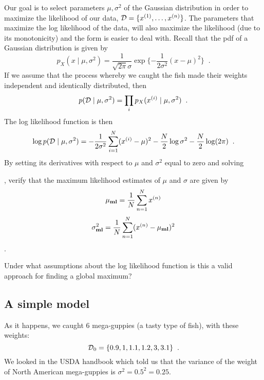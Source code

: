 \documentclass[11pt]{exam}
\newcommand\ex[2]{#1^{(#2)}}
\newcommand\data{{\cal D}}
\newcommand\ml[1]{#1_{\bf ml}}
\newcommand{\note}[1]{\todo[color=blue!10,inline, linecolor=blue!90,size=\footnotesize]{\linespread{0.9}\selectfont{#1}\par}}
\begin{document}
 Our goal is to select parameters $\mu, \sigma^2$ of the Gaussian
 distribution in order to maximize the likelihood of our data,
 $\data = \{\ex{x}{1}, \ldots, \ex{x}{n}\}$.  The parameters that maximize
 the log likelihood of the data, will also maximize the likelihood (due to its monotonicity) and
 the form is easier to deal with.
Recall that the pdf of a Gaussian distribution is given by
\[p_X(x \mid \mu, \sigma^2) = \frac{1}{\sqrt{2 \pi}\sigma}
    \exp\{-\frac{1}{2 \sigma^2}(x - \mu)^2\}\;\;.\]
If we assume that the process whereby we caught the fish made their
weights independent and identically distributed, then 
\[p(\data \mid \mu, \sigma^2) = \prod_i p_X(\ex{x}{i} \mid \mu,
  \sigma^2)\;\;.\]
The log likelihood function is then
$$
\log p(\data \mid \mu, \sigma^2)=-\frac{1}{2\sigma^2}\sum_{i=1}^N
(\ex{x}{i}-\mu)^2-\frac{N}{2}\log \sigma^2 -\frac{N}{2}\log(2\pi)\;\;.
$$
By setting its derivatives with respect to $\mu$ and $\sigma^2$ equal
to zero and solving
\iffalse
\footnote{In the exercises of this class, we often solve the system
  $\nabla_{\theta} L(\theta)=0$ for $\theta$ where $\theta$ is the
  parameter to be estimated (here, $(\mu,\sigma^{2})$) and $L$ is the
  loss function to be minimized (here, $-\log p$). From calculus
  class, we know that this is a necessary condition of $\theta$ being
  a local extremum of $L:U \rightarrow \mathbb{R}$ (where $U$ is an
  open subset of $\mathbb{R}^n$). If the loss function \(L\) is
  convex, this is also a sufficient condition of  $\theta$ being a
  global minimum of $L$. In exercises, we often consider a convex loss
  function \(L\)  where our approach of solving $\nabla_{\theta}
  L(\theta)=0$ is justified.     }
\fi
, verify that the maximum likelihood estimates of $\mu$ and
$\sigma$ are given by
$$\ml\mu=\frac{1}{N}\sum_{n=1}^N \ex{x}{n}$$
$$\ml\sigma^2=\frac{1}{N}\sum_{n=1}^N (\ex{x}{n}-\ml\mu)^2$$ \;\;.

Under what assumptions about the log likelihood function is this a
valid approach for finding a global maximum?

\note{This solution may be different than the estimator you have
  previously seen for $\sigma^2$.  See the discussion at the bottom of
Bishop page 27 for an explanation.} 



\subsection{A simple model}
As it happens, we caught 6 mega-guppies (a tasty type of
fish), with these weights:
\[\data_0 = \{0.9, 1, 1.1, 1.2, 3, 3.1\}\;\;.\]
We looked in the USDA handbook which told us that the variance of
the weight of North American mega-guppies is 
$\sigma^2 = 0.5^2 = 0.25$.
\end{document}
